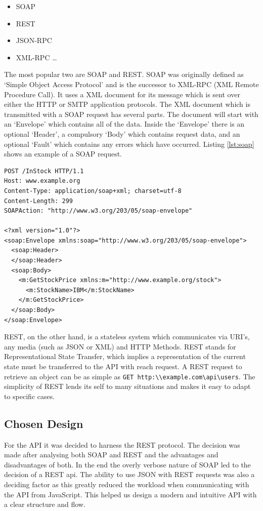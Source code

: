 \documentclass[11pt,a4paper]{report}
\begin{document}
\begin{itemize}
\item SOAP
\item REST
\item JSON-RPC 
\item XML-RPC \ldots
\end{itemize}

The most popular two are SOAP and REST. SOAP was originally defined as `Simple Object Access Protocol' and is the successor to XML-RPC (XML Remote Procedure Call). It uses a XML document for its message which is sent over either the HTTP or SMTP application protocols. The XML document which is transmitted with a SOAP request has several parts. The document will start with an `Envelope' which contains all of the data. Inside the `Envelope' there is an optional `Header', a compulsory `Body' which contains request data, and an optional `Fault' which contains any errors which have occurred. Listing \ref{lst:soap} shows an example of a SOAP request.


\begin{lstlisting}[captionpos=b, caption=An example SOAP request., label=lst:soap, frame=single]
POST /InStock HTTP/1.1
Host: www.example.org
Content-Type: application/soap+xml; charset=utf-8
Content-Length: 299
SOAPAction: "http://www.w3.org/203/05/soap-envelope"
 
<?xml version="1.0"?>
<soap:Envelope xmlns:soap="http://www.w3.org/203/05/soap-envelope">
  <soap:Header>
  </soap:Header>
  <soap:Body>
    <m:GetStockPrice xmlns:m="http://www.example.org/stock">
      <m:StockName>IBM</m:StockName>
    </m:GetStockPrice>
  </soap:Body>
</soap:Envelope>
\end{lstlisting}

REST, on the other hand, is a stateless system which communicates via URI's, any media (such as JSON or XML) and HTTP Methods. REST stands for Representational State Transfer, which implies a representation of the current state must be transferred to the API with reach request. A REST request to retrieve an object can be as simple as \lstinline$GET http:\\example.com\api\users$. The simplicity of REST lends its self to many situations and makes it easy to adapt to specific cases. 

\subsection{Chosen Design}
For the API it was decided to harness the REST protocol. The decision was made after analysing both SOAP and REST and the advantages and disadvantages of both. In the end the overly verbose nature of SOAP led to the decision of a REST api.  The ability to use JSON with REST requests was also a deciding factor as this greatly reduced the workload when communicating with the API from JavaScript. This helped us design a modern and intuitive API with a clear structure and flow. 
\end{document}
